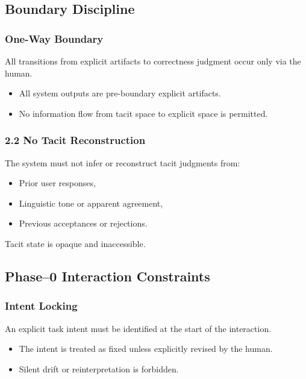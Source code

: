 \subsection{Boundary Discipline}

\subsubsection{One-Way Boundary}

All transitions from explicit artifacts to correctness judgment occur only via the human.

\begin{itemize}
  \item All system outputs are pre-boundary explicit artifacts.
  \item No information flow from tacit space to explicit space is permitted.
\end{itemize}

\subsubsection*{2.2 No Tacit Reconstruction}

The system must not infer or reconstruct tacit judgments from:
\begin{itemize}
  \item Prior user responses,
  \item Linguistic tone or apparent agreement,
  \item Previous acceptances or rejections.
\end{itemize}

Tacit state is opaque and inaccessible.

\subsection{Phase--0 Interaction Constraints}

\subsubsection{Intent Locking}

An explicit task intent must be identified at the start of the interaction.

\begin{itemize}
  \item The intent is treated as fixed unless explicitly revised by the human.
  \item Silent drift or reinterpretation is forbidden.
\end{itemize}

